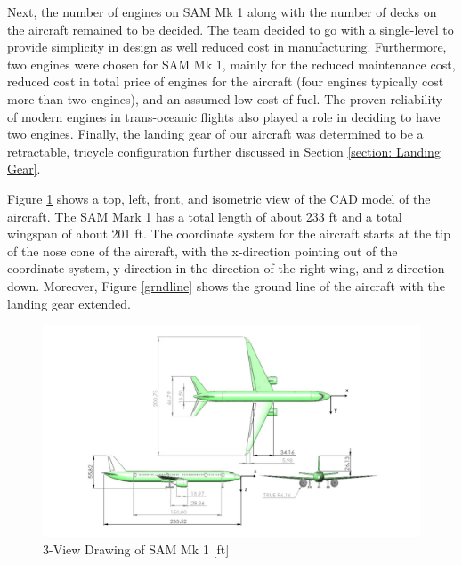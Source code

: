 Next, the number of engines on SAM Mk 1 along with the number of decks on the aircraft remained to be decided. The team decided to go with a single-level to provide simplicity in design as well reduced cost in manufacturing. Furthermore, two engines were chosen for SAM Mk 1, mainly for the reduced maintenance cost, reduced cost in total price of engines for the aircraft (four engines typically cost more than two engines), and an assumed low cost of fuel. The proven reliability of modern engines in trans-oceanic flights also played a role in deciding to have two engines. Finally, the landing gear of our aircraft was determined to be a retractable, tricycle configuration further discussed in Section \ref{section: Landing Gear}. 

\clearpage
Figure \ref{fig:threeview} shows a top, left, front, and isometric view of the CAD model of the aircraft. The SAM Mark 1 has a total length of about 233 ft and a total wingspan of about 201 ft. The coordinate system for the aircraft starts at the tip of the nose cone of the aircraft, with the x-direction pointing out of the coordinate system, y-direction in the direction of the right wing, and z-direction down. Moreover, Figure \ref{grndline} shows the ground line of the aircraft with the landing gear extended.

\begin{figure}[H]
    \centering
    \includegraphics[width=\linewidth, angle =90 ]{Photos/3-view with coords_(4-27-20).pdf}
    \caption{3-View Drawing of SAM Mk 1 [ft]}
    \label{fig:threeview}
\end{figure}
\clearpage

